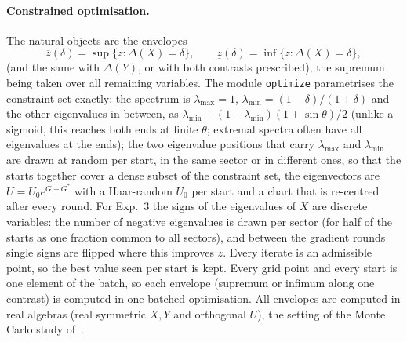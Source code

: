 \documentclass[11pt]{article}
\begin{document}
\paragraph{Constrained optimisation.} The natural objects are the envelopes
\[
  \overline z(\delta)=\sup\{z:\Delta(X)=\delta\},\qquad \underline z(\delta)=\inf\{z:\Delta(X)=\delta\},
\]
(and the same with $\Delta(Y)$, or with both contrasts prescribed), the supremum being taken over all
remaining variables. The module \texttt{optimize} parametrises the constraint set exactly: the spectrum
is $\lambda_{\max}=1$, $\lambda_{\min}=(1-\delta)/(1+\delta)$ and the other eigenvalues in between, as
$\lambda_{\min}+(1-\lambda_{\min})(1+\sin\theta)/2$ (unlike a sigmoid, this reaches both ends at finite $\theta$; extremal
spectra often have all eigenvalues at the ends); the two eigenvalue positions that carry $\lambda_{\max}$ and $\lambda_{\min}$ are drawn at
random per start, in the same sector or in different ones, so that the starts together cover a dense subset of
the constraint set, the eigenvectors are $U=U_0e^{G-G^*}$ with a Haar-random $U_0$ per start and a chart
that is re-centred after every round. For Exp.~3 the signs of the eigenvalues of $X$ are discrete
variables: the number of negative eigenvalues is drawn per sector (for half of the starts as one fraction common to
all sectors), and between the gradient rounds single signs are flipped where this improves $z$. Every iterate is an
admissible point, so the best value seen per start is kept. Every grid point and every start is one element of the batch, so each envelope (supremum
or infimum along one contrast) is computed in one batched optimisation. All envelopes are computed in real algebras
(real symmetric $X,Y$ and orthogonal $U$), the setting of the Monte Carlo study of~\cite{v1}.
\end{document}
